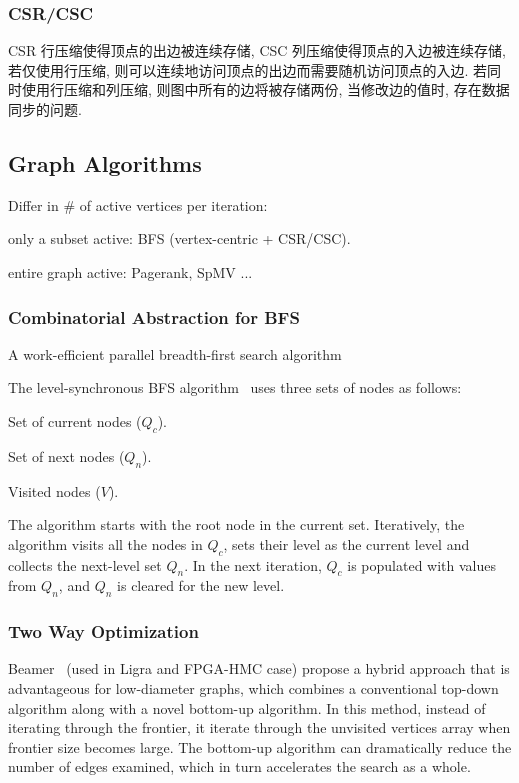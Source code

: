 \documentclass[UTF8,12pt,a4paper]{article}
\begin{document}
\subsubsection{CSR/CSC}
CSR 行压缩使得顶点的出边被连续存储, CSC 列压缩使得顶点的入边被连续存储,
若仅使用行压缩, 则可以连续地访问顶点的出边而需要随机访问顶点的入边.
若同时使用行压缩和列压缩, 则图中所有的边将被存储两份,
当修改边的值时, 存在数据同步的问题.

\subsection{Graph Algorithms}
Differ in \# of active vertices per iteration:
\begin{compactitem}
  \item only a subset active: BFS (vertex-centric + CSR/CSC).
  \item entire graph active: Pagerank, SpMV ...
\end{compactitem}
\subsubsection{Combinatorial Abstraction for BFS}
A work-efficient parallel breadth-first search algorithm
~\cite{DBLP:conf/spaa/LeisersonS10}

The level-synchronous BFS algorithm~\cite{DBLP:conf/ipps/AttiaJTJZ14}
uses three sets of nodes as follows:
\begin{compactitem}
  \item Set of current nodes ($Q_c$).
  \item Set of next nodes ($Q_n$).
  \item Visited nodes ($V$).
\end{compactitem}

The algorithm starts with the root node in the current set.
Iteratively, the algorithm visits all the nodes in $Q_c$,
sets their level as the current level
and collects the next-level set $Q_n$.
In the next iteration, $Q_c$ is populated with values from $Q_n$,
and $Q_n$ is cleared for the new level.
\subsubsection{Two Way Optimization}
Beamer~\cite{DBLP:conf/sc/BeamerAP12} (used in Ligra and FPGA-HMC case)
propose a hybrid approach that is advantageous for low-diameter graphs,
which combines a conventional top-down algorithm
along with a novel bottom-up algorithm.
In this method, instead of iterating through the frontier,
it iterate through the unvisited vertices array when frontier size becomes large.
The bottom-up algorithm can dramatically reduce the number of edges examined,
which in turn accelerates the search as a whole.
\end{document}
